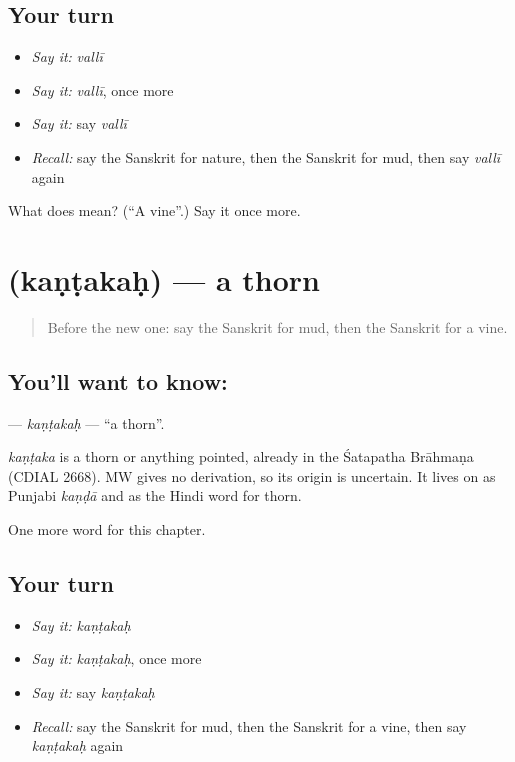 \subsection*{Your turn}
\begin{itemize}
\raggedright
  \item \emph{Say it:} \emph{vallī}
  \item \emph{Say it:} \emph{vallī}, once more
  \item \emph{Say it:} say \emph{vallī}
  \item \emph{Recall:} say the Sanskrit for nature, then the Sanskrit for mud, then say \emph{vallī} again
\end{itemize}

\begin{tcolorbox}[breakable,colback=teal!4,colframe=teal!35!black,title={Before you move on}]
What does  mean? (\textquotedblleft{}A vine\textquotedblright{}.) Say it once more.
\end{tcolorbox}
\section[\texorpdfstring{\sk{कण्टकः} (kaṇṭakaḥ)}{कण्टकः (kaṇṭakaḥ)}]{ (kaṇṭakaḥ) — a thorn}

\label{lesson:SA-C252-kantakah}



\begin{quote}
Before the new one: say the Sanskrit for mud, then the Sanskrit for a vine.
\end{quote}

\subsection*{You'll want to know: }
\textbf{} — \emph{kaṇṭakaḥ} — \textquotedblleft{}a thorn\textquotedblright{}.

\begin{cousinweb}
\emph{kaṇṭaka} is a thorn or anything pointed, already in the Śatapatha Brāhmaṇa (CDIAL 2668). MW gives no derivation, so its origin is uncertain. It lives on as Punjabi \emph{kaṇḍā} and as the Hindi word for thorn.
\end{cousinweb}

\begin{grammarlens}[title={What you've built}]
One more word for this chapter.
\end{grammarlens}

\subsection*{Your turn}
\begin{itemize}
\raggedright
  \item \emph{Say it:} \emph{kaṇṭakaḥ}
  \item \emph{Say it:} \emph{kaṇṭakaḥ}, once more
  \item \emph{Say it:} say \emph{kaṇṭakaḥ}
  \item \emph{Recall:} say the Sanskrit for mud, then the Sanskrit for a vine, then say \emph{kaṇṭakaḥ} again
\end{itemize}

